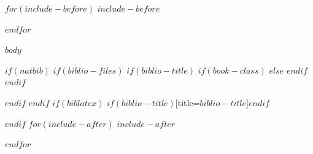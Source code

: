 \documentclass[a4paper, 10pt]{ctexart}
\begin{document}
$for(include-before)$
$include-before$

$endfor$

{
\newpage
\hypersetup{linkcolor=black}
\setcounter{tocdepth}{3}
\tableofcontents
}
\newpage

$body$

$if(natbib)$
$if(biblio-files)$
$if(biblio-title)$
$if(book-class)$
\renewcommand\bibname{$biblio-title$}
$else$
\renewcommand\refname{$biblio-title$}
$endif$
$endif$


$endif$
$endif$
$if(biblatex)$
\printbibliography$if(biblio-title)$[title=$biblio-title$]$endif$

$endif$
$for(include-after)$
$include-after$

$endfor$
\end{document}
